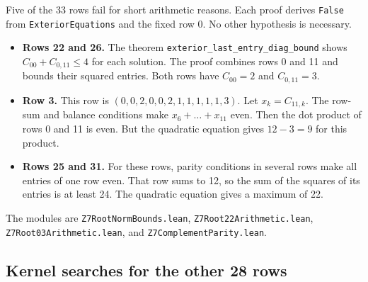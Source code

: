 \documentclass{article}
\theoremstyle{plain}
\theoremstyle{definition}
\numberwithin{equation}{section}
\begin{document}
Five of the 33 rows fail for short arithmetic reasons. Each proof derives \texttt{False} from \texttt{ExteriorEquations} and the fixed row 0. No other hypothesis is necessary.
\begin{itemize}
 \item \textbf{Rows 22 and 26.} The theorem \texttt{exterior\_last\_entry\_diag\_bound} shows $C_{00} + C_{0,11} \le 4$ for each solution. The proof combines rows 0 and 11 and bounds their squared entries. Both rows have $C_{00} = 2$ and $C_{0,11} = 3$.
 \item \textbf{Row 3.} This row is $(0,0,2,0,0,2,1,1,1,1,1,3)$. Let $x_k = C_{11,k}$. The row-sum and balance conditions make $x_6 + \dots + x_{11}$ even. Then the dot product of rows 0 and 11 is even. But the quadratic equation gives $12 - 3 = 9$ for this product.
 \item \textbf{Rows 25 and 31.} For these rows, parity conditions in several rows make all entries of one row even. That row sums to 12, so the sum of the squares of its entries is at least 24. The quadratic equation gives a maximum of 22.
\end{itemize}
The modules are \texttt{Z7RootNormBounds.lean}, \texttt{Z7Root22Arithmetic.lean}, \texttt{Z7Root03Arithmetic.lean}, and \texttt{Z7ComplementParity.lean}.

\subsection{Kernel searches for the other 28 rows}
\end{document}
